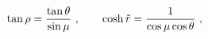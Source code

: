\begin{equation}
\tan%
{\rho}= {\tan\theta\over \sin\mu}\ , \quad 
\quad \cosh\tilde{r} ={1\over \cos\mu\cos\theta}\ ,
\label{coordch}
\end{equation}


